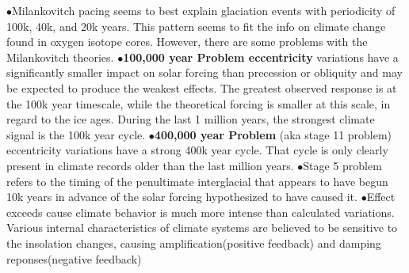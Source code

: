 \documentclass{article}
\newcommand{\ddd}{$\bullet$}
\begin{document}
\begin{multicols*}{4}
	        \ddd Milankovitch pacing seems to best explain glaciation events with periodicity of 100k, 40k, and 20k years. This pattern seems to fit the info on climate change found in oxygen isotope cores. However, there are some problems with the Milankovitch theories.
	        \ddd \textbf{100,000 year Problem eccentricity} variations have a significantly smaller impact on solar forcing than precession or obliquity and may be expected to produce the weakest effects. The greatest observed response is at the 100k year timescale, while the theoretical forcing is smaller at this scale, in regard to the ice ages. During the last 1 million years, the strongest climate signal is the 100k year cycle.
	        \ddd \textbf{400,000 year Problem} (aka stage 11 problem) eccentricity variations have a strong 400k year cycle. That cycle is only clearly present in climate records older than the last million years.
	        \ddd Stage 5 problem refers to the timing of the penultimate interglacial that appears to have begun 10k years in advance of the solar forcing hypothesized to have caused it.
	        \ddd Effect exceeds cause climate behavior is much more intense than calculated variations. Various internal characteristics of climate systems are believed to be sensitive to the insolation changes, causing amplification(positive feedback) and damping reponses(negative feedback)
	        

\end{multicols*}
\end{document}
